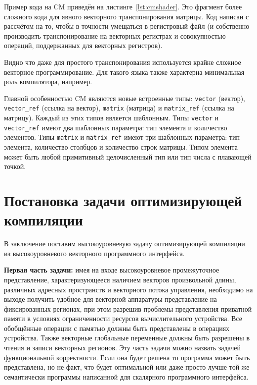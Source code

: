 Пример кода на CM приведён на листинге~\cref{lst:cmshader}. Это фрагмент более сложного кода для явного векторного транспонирования матрицы. Код написан с рассчётом на то, чтобы в точности умещаться в регистровый файл (и собственно производить транспонирование на векторных регистрах и совокупностью операций, поддержанных для векторных регистров).

Видно что даже для простого транспонирования используется крайне сложное векторное программирование. Для такого языка также характерна минимальная роль компилятора, например.

Главной особенностью CM являются новые встроенные типы: \lstinline!vector! (вектор), \lstinline!vector_ref! (ссылка на вектор), \lstinline!matrix! (матрица) и \lstinline!matrix_ref! (ссылка на матрицу). Каждый из этих типов является шаблонным. Типы \lstinline!vector! и \lstinline!vector_ref! имеют два шаблонных параметра: тип элемента и количество элементов. Типы \lstinline!matrix! и \lstinline!matrix_ref! имеют три шаблонных параметра: тип элемента, количество столбцов и количество строк матрицы. Типом элемента может быть любой примитивный целочисленный тип или тип числа с плавающей точкой.

\section{Постановка задачи оптимизирующей компиляции}\label{sec:overview/howtobetter}

В заключение поставим высокоуровневую задачу оптимизирующей компиляции из высокоуровневого векторного программного интерфейса.

\textbf{Первая часть задачи:} имея на входе высокоуровневое промежуточное представление, характеризующееся наличием векторов произвольной длины, различных адресных пространств и векторного потока управления, необходимо на выходе получить удобное для векторной аппаратуры представление на фиксированных регионах, при этом разрешив проблемы представления приватной памяти в условиях ограниченности ресурсов вычислительного устройства. Все обобщённые операции с памятью должны быть представлены в операциях устройства. Также векторные глобальные переменные должны быть разрешены в чтения и записи векторных регионов. Эту часть задачи можно назвать задачей функциональной корректности. Если она будет решена то программа может быть представлена, но не факт, что будет оптимальной или даже просто лучше той же семантически программы написанной для скалярного программного интерфейса.


